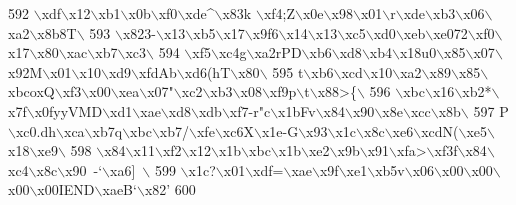 \begin{DoxyCode}
592 \textcolor{stringliteral}{\(\backslash\)xdf\(\backslash\)x12\(\backslash\)xb1\(\backslash\)x0b\(\backslash\)xf0\(\backslash\)xde^\(\backslash\)x83k \(\backslash\)xf4;Z\(\backslash\)x0e\(\backslash\)x98\(\backslash\)x01\(\backslash\)r\(\backslash\)xde\(\backslash\)xb3\(\backslash\)x06\(\backslash\)xa2\(\backslash\)x8b8T\(\backslash\)}
593 \textcolor{stringliteral}{\(\backslash\)x823-\(\backslash\)x13\(\backslash\)xb5\(\backslash\)x17\(\backslash\)x9f6\(\backslash\)x14\(\backslash\)x13\(\backslash\)xc5\(\backslash\)xd0\(\backslash\)xeb\(\backslash\)xe072\(\backslash\)xf0\(\backslash\)x17\(\backslash\)x80\(\backslash\)xac\(\backslash\)xb7\(\backslash\)xc3\(\backslash\)}
594 \textcolor{stringliteral}{\(\backslash\)xf5\(\backslash\)xc4g\(\backslash\)xa2rPD\(\backslash\)xb6\(\backslash\)xd8\(\backslash\)xb4\(\backslash\)x18u0\(\backslash\)x85\(\backslash\)x07\(\backslash\)x92M\(\backslash\)x01\(\backslash\)x10\(\backslash\)xd9\(\backslash\)xfdAb\(\backslash\)xd6(hT\(\backslash\)x80\(\backslash\)}
595 \textcolor{stringliteral}{t\(\backslash\)xb6\(\backslash\)xcd\(\backslash\)x10\(\backslash\)xa2\(\backslash\)x89\(\backslash\)x85\(\backslash\)xbcoxQ\(\backslash\)xf3\(\backslash\)x00\(\backslash\)xea\(\backslash\)x07"\(\backslash\)xc2\(\backslash\)xb3\(\backslash\)x08\(\backslash\)xf9p\(\backslash\)t\(\backslash\)x88>\{\(\backslash\)}
596 \textcolor{stringliteral}{\(\backslash\)xbc\(\backslash\)x16\(\backslash\)xb2*\(\backslash\)x7f\(\backslash\)x0fyyVMD\(\backslash\)xd1\(\backslash\)xae\(\backslash\)xd8\(\backslash\)xdb\(\backslash\)xf7-r"c\(\backslash\)x1bFv\(\backslash\)x84\(\backslash\)x90\(\backslash\)x8e\(\backslash\)xcc\(\backslash\)x8b\(\backslash\)}
597 \textcolor{stringliteral}{P\(\backslash\)xc0.dh\(\backslash\)xca\(\backslash\)xb7q\(\backslash\)xbc\(\backslash\)xb7/\(\backslash\)xfe\(\backslash\)xc6X\(\backslash\)x1e-G\(\backslash\)x93\(\backslash\)x1c\(\backslash\)x8c\(\backslash\)xe6\(\backslash\)xcdN(\(\backslash\)xe5\(\backslash\)x18\(\backslash\)xe9\(\backslash\)}
598 \textcolor{stringliteral}{\(\backslash\)x84\(\backslash\)x11\(\backslash\)xf2\(\backslash\)x12\(\backslash\)x1b\(\backslash\)xbc\(\backslash\)x1b\(\backslash\)xe2\(\backslash\)x9b\(\backslash\)x91\(\backslash\)xfa>\(\backslash\)xf3f\(\backslash\)x84\(\backslash\)xc4\(\backslash\)x8c\(\backslash\)x90~-`\(\backslash\)xa6]~\(\backslash\)}
599 \textcolor{stringliteral}{\(\backslash\)x1c?\(\backslash\)x01\(\backslash\)xdf=\(\backslash\)xae\(\backslash\)x9f\(\backslash\)xe1\(\backslash\)xb5v\(\backslash\)x06\(\backslash\)x00\(\backslash\)x00\(\backslash\)x00\(\backslash\)x00IEND\(\backslash\)xaeB`\(\backslash\)x82'}
600 
\end{DoxyCode}
\mbox{\label{namespaceimages_a80f5f18c45716de64354e8a3cd06e245}} 
